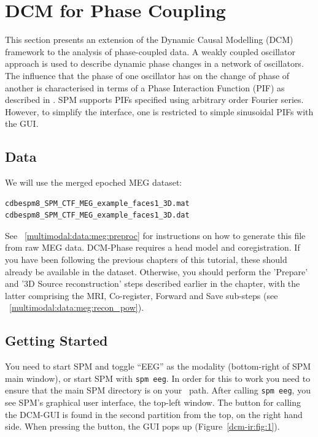 \section{DCM for Phase Coupling \label{multimodal:data:dcm_phase}}

This section presents an extension of the Dynamic Causal Modelling (DCM) framework to the analysis of phase-coupled data. A weakly coupled oscillator approach is used to describe dynamic phase changes in a network of oscillators.
The influence that the phase of one oscillator has on the change of phase of another is characterised in terms of a Phase Interaction Function (PIF) as described in \cite{dcm_phase}. SPM supports PIFs specified using arbitrary order Fourier series. However, to simplify the interface, one is restricted to simple sinusoidal PIFs with the GUI. 

\subsection{Data}

We will use the merged epoched MEG dataset:

\begin{verbatim}
cdbespm8_SPM_CTF_MEG_example_faces1_3D.mat
cdbespm8_SPM_CTF_MEG_example_faces1_3D.dat
\end{verbatim}

See ~\ref{multimodal:data:meg:preproc} for instructions on how to generate this file from raw MEG data. DCM-Phase requires a head model and coregistration. If you have been following the previous chapters of this tutorial, these should already be available in the dataset. Otherwise, you should perform the 'Prepare' and '3D Source reconstruction' steps described earlier in the chapter, with the latter 
comprising the MRI, Co-register, Forward and Save sub-steps (see ~\ref{multimodal:data:meg:recon_pow}).

\subsection{Getting Started}

You need to start SPM and toggle ``EEG'' as the modality (bottom-right of SPM main window), or start SPM with \texttt{spm eeg}. In order for this to work you need to ensure that the main SPM directory is on your \matlab\ path.
After calling \texttt{spm eeg}, you see SPM's graphical user interface, the top-left window. The button for calling the DCM-GUI is found in the second partition from the top, on the right hand side. When pressing the button, the GUI pops up (Figure~\ref{dcm-ir:fig:1}).

